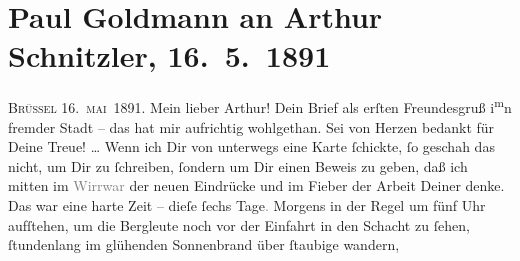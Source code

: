 

         
         \renewcommand{\erwaehntePersonen}{Personen: Richard Beer-Hofmann, Hugo von Hofmannsthal, Jaques Joachim, Julius Kulka, Felix Salten, Falk Schupp, Gustav Schwarzkopf, Boris Van-Jung, Leo Van-Jung, Olga Waissnix}
         \renewcommand{\erwaehnteInstitutionen}{Institutionen: Houghton Library, Jung Wien}
         \renewcommand{\erwaehnteOrte}{Orte: Bad Ischl, Baden bei Wien, Belgien, Brüssel, Halle an der Saale, Joseph G. Wieninger, Weinhandlung, Wien}
         \renewcommand{\erwaehnteWerke}{Werke: Das Märchen. Schauspiel in drei Aufzügen, Frankfurter Zeitung, Tagebuch}
               \section[Paul Goldmann an Arthur Schnitzler, 16. 5. 1891]{ Paul Goldmann an Arthur Schnitzler, 16. 5. 1891}\nopagebreak{}\rehead{ }\begin{ledgroupsized}[t]{13cm}\normalsize\beginnumbering \toendnotes[C]{\smallbreak\pagebreak[2]} 
\toendnotes[C]{\smallbreak}\pstart
           \centering{}{\pb}\textsc{Brüssel}{ }16. \textsc{mai} 1891.\pend
           \pstart\center{}Mein lieber Arthur!\pend\pstart
           Dein Brief als erſten Freundesgruß i\substVorne{}\textsuperscript{m}\substDazwischen{}n\substHinten{} fremder Stadt – das
               hat mir aufrichtig wohlgethan. Sei von Herzen bedankt für Deine Treue! {\dots} Wenn ich Dir von unterwegs eine Karte ſchickte, ſo
               geschah das nicht, um Dir zu ſchreiben, ſondern um Dir einen Beweis zu geben, daß ich
               mitten im \textcolor{gray}{Wirrwar} der neuen Eindrücke und im Fieber der Arbeit
               Deiner denke. Das war eine harte Zeit – dieſe ſechs Tage\textcolor{gray}{.} Morgens
               in der Regel um fünf Uhr aufſtehen, um die Bergleute noch vor der Einfahrt in den
               Schacht zu ſehen, ſtundenlang im glühenden Sonnenbrand über ſtaubige \label{K_L02663-1v}\label{K_L02663-1h} wandern,

\end{ledgroupsized}
